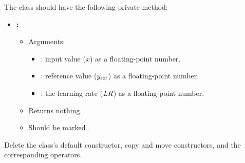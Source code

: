 The class should have the following private method:
\begin{itemize}
  \item \textbf{:}
  \begin{itemize}
    \item Arguments:
    \begin{itemize}
      \item {}: input value ($x$) as a floating-point number.
      \item {}: reference value ($y_{\mathrm{ref}}$) as a floating-point number.
      \item {}: the learning rate ($\mathit{LR}$) as a floating-point number.
    \end{itemize}
    \item Returns nothing.
    \item Should be marked .
  \end{itemize}
\end{itemize}

\label{c1:ex:8}
Delete the class's default constructor, copy and move constructors, and the corresponding
operators.


